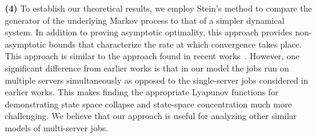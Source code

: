 \documentclass[a4paper]{article}
\theoremstyle{plain}
\theoremstyle{definition}
\theoremstyle{case}
\theoremstyle{remark}
\begin{document}
{\bf (4)} To establish our theoretical results, we employ Stein's method to compare the generator of the underlying Markov process to that of a simpler dynamical system. 
In addition to proving asymptotic optimality, this approach provides non-asymptotic bounds that characterize the rate at which convergence takes place.
This approach is similar to the approach found in recent works~\cite{lei_ying_2020_Stein,Srikant_Stein_2020}. 
However, one significant difference from earlier works is that in our model the jobs run on multiple servers simultaneously as opposed to the single-server jobs considered in earlier works. This makes finding the appropriate Lyapunov functions for demonstrating state space collapse and state-space concentration much more challenging. We believe that our approach is useful for analyzing other similar models of multi-server jobs. 
\end{document}
